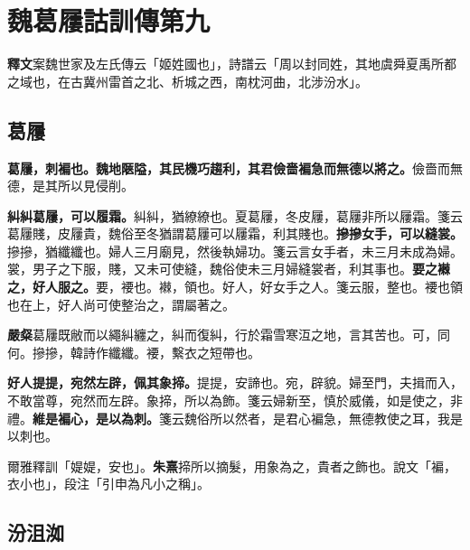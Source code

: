 \chapter{魏葛屨詁訓傳第九}

\begin{quoting}\textbf{釋文}案魏世家及左氏傳云「姬姓國也」，詩譜云「周以封同姓，其地虞舜夏禹所都之域也，在古冀州雷首之北、析城之西，南枕河曲，北涉汾水」。\end{quoting}

\section{葛屨}


\textbf{葛屨，刺褊也。魏地陿隘，其民機巧趨利，其君儉嗇褊急而無德以將之。}{\footnotesize 儉嗇而無德，是其所以見侵削。}

\textbf{糾糾葛屨，可以履霜。}{\footnotesize 糾糾，猶繚繚也。夏葛屨，冬皮屨，葛屨非所以屨霜。箋云葛屨賤，皮屨貴，魏俗至冬猶謂葛屨可以屨霜，利其賤也。}\textbf{摻摻女手，可以縫裳。}{\footnotesize 摻摻，猶纖纖也。婦人三月廟見，然後執婦功。箋云言女手者，未三月未成為婦。裳，男子之下服，賤，又未可使縫，魏俗使未三月婦縫裳者，利其事也。}\textbf{要之襋之，好人服之。}{\footnotesize 要，䙅也。襋，領也。好人，好女手之人。箋云服，整也。䙅也領也在上，好人尚可使整治之，謂屬著之。}

\begin{quoting}\textbf{嚴粲}葛屨既敝而以繩糾纏之，糾而復糾，行於霜雪寒沍之地，言其苦也。可，同何。摻摻，韓詩作纖纖。䙅，繫衣之短帶也。\end{quoting}

\textbf{好人提提，宛然左辟，佩其象揥。}{\footnotesize 提提，安諦也。宛，辟貌。婦至門，夫揖而入，不敢當尊，宛然而左辟。象揥，所以為飾。箋云婦新至，慎於威儀，如是使之，非禮。}\textbf{維是褊心，是以為刺。}{\footnotesize 箋云魏俗所以然者，是君心褊急，無德教使之耳，我是以刺也。}

\begin{quoting}爾雅釋訓「媞媞，安也」。\textbf{朱熹}揥所以摘髮，用象為之，貴者之飾也。說文「褊，衣小也」，段注「引申為凡小之稱」。\end{quoting}

\section{汾沮洳}


